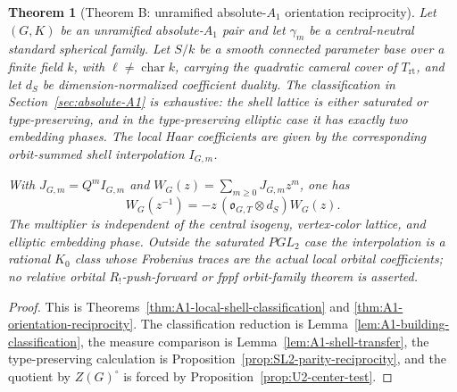 \documentclass[11pt]{article}
\newtheorem{theorem}{Theorem}[section]
\theoremstyle{definition}
\theoremstyle{remark}
\newcommand{\rt}{\mathrm{rt}}
\begin{document}
\begin{theorem}[Theorem B: unramified absolute-$A_1$ orientation reciprocity]
\label{thm:main-A1-reciprocity}
Let $(G,K)$ be an unramified absolute-$A_1$ pair and let $\gamma_m$ be a
central-neutral standard spherical family.  Let $S/k$ be a smooth connected
parameter base over a finite field $k$, with $\ell\ne\operatorname{char}k$,
carrying the quadratic cameral cover of $T_{\rt}$, and let
$d_S$ be dimension-normalized coefficient duality.  The classification in
Section~\ref{sec:absolute-A1} is exhaustive: the shell lattice is either
saturated or type-preserving, and in the type-preserving elliptic case it has
exactly two embedding phases.  The local Haar coefficients are given by the
corresponding orbit-summed shell interpolation $I_{G,m}$.

With $J_{G,m}=Q^mI_{G,m}$ and
$W_G(z)=\sum_{m\ge0}J_{G,m}z^m$, one has
\begin{equation}
 \boxed{
 W_G(z^{-1})
 =-z\,(\mathfrak o_{G,T}\otimes d_S)W_G(z).}
 \label{eq:main-A1-reciprocity}
\end{equation}
The multiplier is independent of the central isogeny, vertex-color lattice,
and elliptic embedding phase.  Outside the saturated $PGL_2$ case the
interpolation is a rational $K_0$ class whose Frobenius traces are the actual
local orbital coefficients; no relative orbital $R_!$-push-forward or fppf
orbit-family theorem is asserted.
\end{theorem}

\begin{proof}
This is Theorems~\ref{thm:A1-local-shell-classification} and
\ref{thm:A1-orientation-reciprocity}.  The classification reduction is
Lemma~\ref{lem:A1-building-classification}, the measure comparison is
Lemma~\ref{lem:A1-shell-transfer}, the type-preserving calculation is
Proposition~\ref{prop:SL2-parity-reciprocity}, and the quotient by
$Z(G)^\circ$ is forced by Proposition~\ref{prop:U2-center-test}.
\end{proof}
\end{document}
